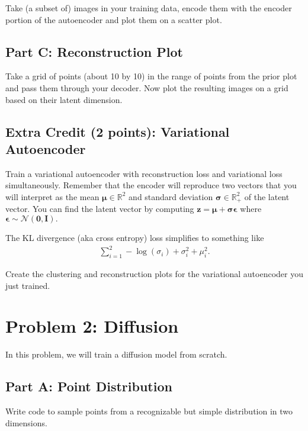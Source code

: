\documentclass{article}
\begin{document}
Take (a subset of) images in your training data, encode them with the encoder portion of the autoencoder and plot them on a scatter plot.

\subsection*{Part C: Reconstruction Plot}

Take a grid of points (about 10 by 10) in the range of points from the prior plot and pass them through your decoder.
Now plot the resulting images on a grid based on their latent dimension.

\subsection*{Extra Credit (2 points): Variational Autoencoder}

Train a variational autoencoder with reconstruction loss and variational loss simultaneously.
Remember that the encoder will reproduce two vectors that you will interpret as the mean $\bm{\mu} \in \mathbb{R}^2$ and standard deviation $\bm{\sigma} \in \mathbb{R}_+^2$ of the latent vector.
You can find the latent vector by computing $\mathbf{z} = \bm{\mu} + \bm{\sigma} \bm{\epsilon}$ where $\bm{\epsilon} \sim \mathcal{N}(\bm{0}, \bm{I}).$

The KL divergence (aka cross entropy) loss simplifies to something like
\begin{align}
    \sum_{i=1}^2 -\log(\sigma_i) + \sigma_i^2 + \mu_i^2.
\end{align}

Create the clustering and reconstruction plots for the variational autoencoder you just trained.

%

\newpage \section*{Problem 2: Diffusion}

In this problem, we will train a diffusion model from scratch.

\subsection*{Part A: Point Distribution}

Write code to sample points from a recognizable but simple distribution in two dimensions.
\end{document}
